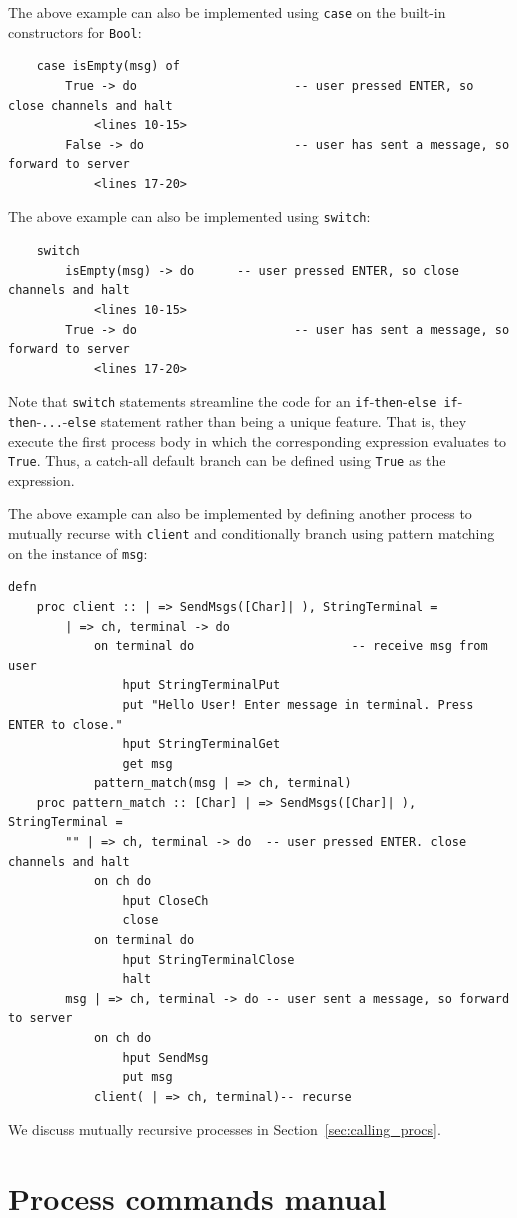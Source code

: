 \documentclass[11pt]{article}
\begin{document}
The above example can also be implemented using \lstinline$case$ on the built-in constructors for \lstinline{Bool}:
\begin{lstlisting}
	case isEmpty(msg) of
		True -> do						-- user pressed ENTER, so close channels and halt
			<lines 10-15>
		False -> do						-- user has sent a message, so forward to server
			<lines 17-20>
\end{lstlisting}

The above example can also be implemented using \lstinline$switch$:\begin{lstlisting}
	switch
		isEmpty(msg) -> do		-- user pressed ENTER, so close channels and halt
			<lines 10-15>
		True -> do						-- user has sent a message, so forward to server
			<lines 17-20>
\end{lstlisting}
Note that \lstinline$switch$ statements streamline the code for an \lstinline$if$-\lstinline$then$-\lstinline$else if$-\lstinline$then$-\lstinline$...$-\lstinline$else$ statement rather than being a unique feature.
That is, they execute the first process body in which the corresponding expression evaluates to \lstinline$True$.
Thus, a catch-all default branch can be defined using \lstinline$True$ as the expression.

The above example can also be implemented by defining another process to mutually recurse with \lstinline{client} and conditionally branch using pattern matching on the instance of \lstinline{msg}: 
\begin{lstlisting}[label=ex:pattern_matching, caption=Conditional branching using pattern matching]
defn
	proc client :: | => SendMsgs([Char]| ), StringTerminal =
		| => ch, terminal -> do
			on terminal do						-- receive msg from user
				hput StringTerminalPut
				put "Hello User! Enter message in terminal. Press ENTER to close."
				hput StringTerminalGet
				get msg
			pattern_match(msg | => ch, terminal)
	proc pattern_match :: [Char] | => SendMsgs([Char]| ), StringTerminal =
		"" | => ch, terminal -> do	-- user pressed ENTER. close channels and halt
			on ch do 
				hput CloseCh
				close 
			on terminal do
				hput StringTerminalClose	
				halt 
		msg | => ch, terminal -> do	-- user sent a message, so forward to server
			on ch do											
				hput SendMsg
				put msg
			client( | => ch, terminal)-- recurse 
\end{lstlisting}   
We discuss mutually recursive processes in Section~\ref{sec:calling_procs}.


\section{Process commands manual}
\label{sec:concurrent-operators}
\label{Sec:concurrent-commands}
\end{document}
